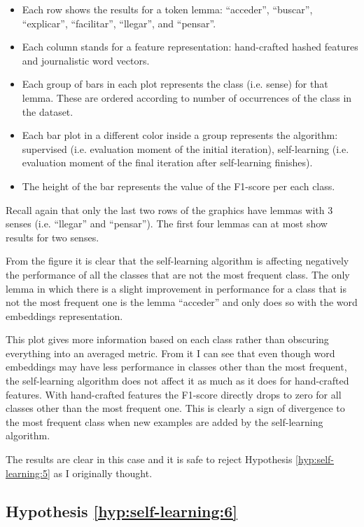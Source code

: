 \begin{itemize}
  \item Each row shows the results for a token lemma: ``acceder'', ``buscar'',
    ``explicar'', ``facilitar'', ``llegar'', and ``pensar''.
  \item Each column stands for a feature representation: hand-crafted hashed
    features and journalistic word vectors.
  \item Each group of bars in each plot represents the class (i.e. sense) for
    that lemma. These are ordered according to number of occurrences of the
    class in the dataset.
  \item Each bar plot in a different color inside a group represents the
    algorithm: supervised (i.e. evaluation moment of the initial iteration),
    self-learning (i.e. evaluation moment of the final iteration after
    self-learning finishes).
  \item The height of the bar represents the value of the F1-score per each
    class.
\end{itemize}

Recall again that only the last two rows of the graphics have lemmas with 3
senses (i.e. ``llegar'' and ``pensar''). The first four lemmas can at most show
results for two senses.

From the figure it is clear that the self-learning algorithm is affecting
negatively the performance of all the classes that are not the most frequent
class. The only lemma in which there is a slight improvement in performance for
a class that is not the most frequent one is the lemma ``acceder'' and only
does so with the word embeddings representation.

This plot gives more information based on each class rather than obscuring
everything into an averaged metric. From it I can see that even though word
embeddings may have less performance in classes other than the most frequent,
the self-learning algorithm does not affect it as much as it does for
hand-crafted features. With hand-crafted features the F1-score directly drops
to zero for all classes other than the most frequent one. This is clearly a
sign of divergence to the most frequent class when new examples are added by
the self-learning algorithm.

The results are clear in this case and it is safe to reject Hypothesis
\ref{hyp:self-learning:5} as I originally thought.

\subsection{Hypothesis \ref{hyp:self-learning:6}}\label{sec:self-learning:hyp:6}

